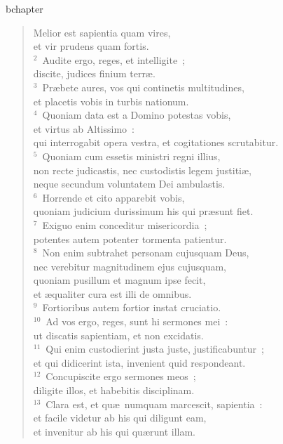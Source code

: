 bchapter\begin{verse}\vspace{-19pt}Melior est sapientia quam vires,\\ et vir prudens quam fortis.\\
${}^{2}$~Audite ergo, reges, et intelligite~;\\ discite, judices finium terr\ae .\\
${}^{3}$~Pr\ae bete aures, vos qui continetis multitudines,\\ et placetis vobis in turbis nationum.\\
${}^{4}$~Quoniam data est a Domino potestas vobis,\\ et virtus ab Altissimo~:\\ qui interrogabit opera vestra, et cogitationes scrutabitur.\\
${}^{5}$~Quoniam cum essetis ministri regni illius,\\ non recte judicastis, nec custodistis legem justiti\ae ,\\ neque secundum voluntatem Dei ambulastis.\\
${}^{6}$~Horrende et cito apparebit vobis,\\ quoniam judicium durissimum his qui pr\ae sunt fiet.\\
${}^{7}$~Exiguo enim conceditur misericordia~;\\ potentes autem potenter tormenta patientur.\\
${}^{8}$~Non enim subtrahet personam cujusquam Deus,\\ nec verebitur magnitudinem ejus cujusquam,\\ quoniam pusillum et magnum ipse fecit,\\ et \ae qualiter cura est illi de omnibus.\\
${}^{9}$~Fortioribus autem fortior instat cruciatio.\\
${}^{10}$~Ad vos ergo, reges, sunt hi sermones mei~:\\ ut discatis sapientiam, et non excidatis.\\
${}^{11}$~Qui enim custodierint justa juste, justificabuntur~;\\ et qui didicerint ista, invenient quid respondeant.\\
${}^{12}$~Concupiscite ergo sermones meos~;\\ diligite illos, et habebitis disciplinam.\\
${}^{13}$~Clara est, et qu\ae\ numquam marcescit, sapientia~:\\ et facile videtur ab his qui diligunt eam,\\ et invenitur ab his qui qu\ae runt illam.\\

\end{verse}
